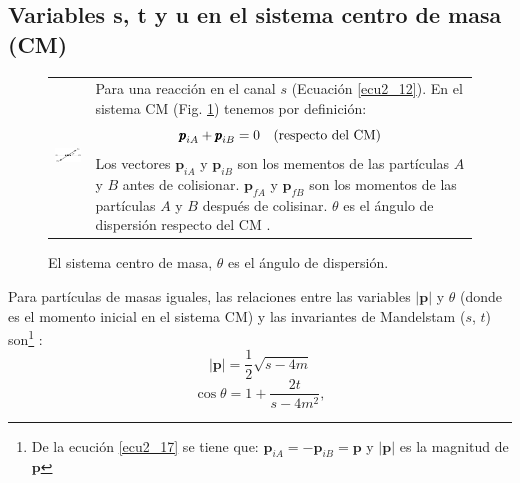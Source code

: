 \subsection*{Variables s, t y u en el sistema centro de masa (CM)}
\begin{figure}[H]
\begin{tabular}{p{5cm}p{4cm}}
\begin{minipage}[l]{5cm}
\includegraphics[width=4.6cm]{Imagenes/figurastesis/sistemaCM.png}
\caption{El sistema centro de masa, $\theta$ es el \'angulo de dispersi\'on.}
\label{figsistemaCM}
\end{minipage}
&
\begin{minipage}[r]{9.45cm}
Para una reacci\'on en el canal $s$ (Ecuaci\'on \ref{ecu2_12}). En el sistema CM (Fig. \ref{figsistemaCM}) tenemos por definici\'on:
\begin{equation}\label{ecu2_17}
{\pmb p}_{iA}+{\pmb p}_{iB}=0\ \ \ \textup{(respecto del CM)}
\end{equation}
Los vectores $\pmb{p}_{iA}$  y $\pmb{p}_{iB}$ son los mementos de las part\'iculas $A$ y $B$ antes de colisionar. $\pmb{p}_{fA}$ y $\pmb{p}_{fB}$ son los momentos de las part\'iculas $A$ y $B$ despu\'es de colisinar. $\theta$ es el \'angulo de dispersi\'on respecto del CM \cite{varone}. 
\end{minipage}
\end{tabular}
\end{figure}
Para part\'iculas de masas iguales, las relaciones entre las variables $|\pmb{p}|$ y  $\theta$ (donde  es el momento inicial en el sistema CM)  y las invariantes de  Mandelstam ($s$, $t$) son\footnote{De la ecuci\'on \ref{ecu2_17} se tiene que: ${\pmb p}_{iA}=-{\pmb p}_{iB}={\pmb p}$ y $|\pmb{p}|$ es la magnitud de $\pmb{p}$} :
\begin{equation}\label{ecu2_18}
|\pmb{p}|=\frac{1}{2}\sqrt{s-4m}
\end{equation}
\begin{equation}\label{ecu2_19}
\cos\theta=1+\frac{2t}{s-4m^2},
\end{equation}
